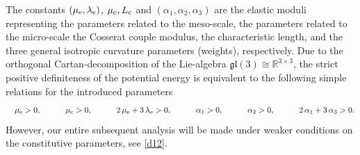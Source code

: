 \documentclass[10pt]{article}
\begin{document}
The constants $(\mu_{\rm e},\lambda_{\rm e}) $,  $\mu_{\rm c}, L_{\rm c} $  and $( \alpha_1, \alpha_2, \alpha_3)$  are the elastic moduli  representing the parameters related to the meso-scale,  the
 parameters related to the micro-scale the Cosserat couple modulus, the characteristic length, and the three
 general isotropic curvature parameters (weights), respectively.   
  Due to the orthogonal Cartan-decomposition of the Lie-algebra $\mathfrak{gl}(3)\cong\mathbb{R}^{3\times 3}$, the strict positive definiteness of the potential energy is equivalent to the following simple relations for the introduced parameters  \cite{NeffGhibaMicroModel}
 \begin{align}
 	\quad\mu_{\rm e}  >0, \qquad \quad\mu_{\rm c}>0,\qquad \quad  2\,\mu_{\rm e} +3\,\lambda_{\rm e} >0,\qquad \quad \alpha_1>0, \qquad \quad\alpha_2>0, \qquad \quad 2\,\alpha_1+3\,\alpha_3>0 . \label{posCoss}
 \end{align}
 However, our entire subsequent analysis will be made under weaker conditions on the constitutive parameters,  { see \eqref{d12}}.
 
\end{document}
